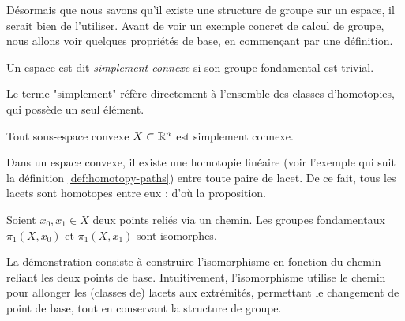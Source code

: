 Désormais que nous savons qu'il existe une structure de groupe sur un espace, il serait bien de l'utiliser. Avant de voir un exemple concret de calcul de groupe, nous allons voir quelques propriétés de base, en commençant par une définition.

\begin{definition}
Un espace est dit \emph{simplement connexe} si son groupe fondamental est trivial.
\end{definition}

Le terme "simplement" réfère directement à l'ensemble des classes d'homotopies, qui possède un seul élément.

\begin{proposition}
Tout sous-espace convexe $X\subset\mathbb{R}^n$ est simplement connexe.
\end{proposition}

Dans un espace convexe, il existe une homotopie linéaire (voir l'exemple qui suit la définition \ref{def:homotopy-paths}) entre toute paire de lacet. De ce fait, tous les lacets sont homotopes entre eux : d'où la proposition.

\begin{proposition}
Soient $x_0,x_1\in X$ deux points reliés via un chemin. Les groupes fondamentaux $\pi_1(X,x_0)$ et $\pi_1(X,x_1)$ sont isomorphes.
\end{proposition}

La démonstration consiste à construire l'isomorphisme en fonction du chemin reliant les deux points de base. Intuitivement, l'isomorphisme utilise le chemin pour allonger les (classes de) lacets aux extrémités, permettant le changement de point de base, tout en conservant la structure de groupe.

